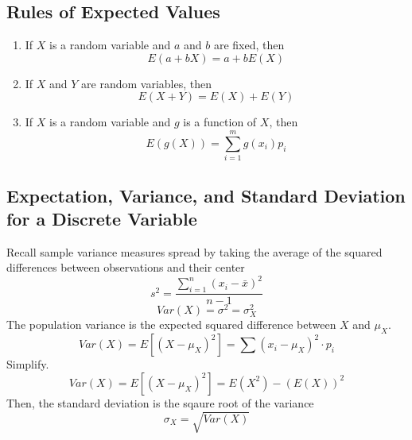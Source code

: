 \subsection{Rules of Expected Values}  %
\begin{enumerate}
    \item If $X$ is a random variable and $a$ and $b$ are fixed, then
          \[E(a+bX)=a+bE(X)\]
    \item If $X$ and $Y$ are random variables, then
          \[E(X+Y)=E(X)+E(Y)\]
    \item If $X$ is a random variable and $g$ is a function of $X$, then
          \[E(g(X))=\sum_{i=1}^m g(x_i)p_i\]
          \subitem {}
\end{enumerate}

\subsection{Expectation, Variance, and Standard Deviation for a Discrete Variable}  %
Recall sample variance measures spread by taking the average of the squared differences between observations and their center
\begin{equation}
    s^2=\frac{\sum_{i=1}^{n}{(x_i-\bar{x})}^2}{n-1}
\end{equation}
\begin{equation}
    Var(X)=\sigma^2 = \sigma_X^2
\end{equation}
The population variance is the expected squared difference between $X$ and $\mu_X$.
\begin{equation}
    Var(X)=E[{(X-\mu_X)}^2]=\sum{(x_i-\mu_X)}^2\cdot p_i
\end{equation}
Simplify.
\begin{equation}
    Var(X)=E[{(X-\mu_X)}^2]=E(X^2)-(E(X))^2
\end{equation}
Then, the standard deviation is the sqaure root of the variance
\begin{equation}
    \sigma_X=\sqrt{Var(X)}
\end{equation}

